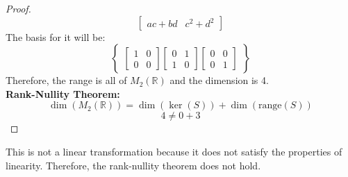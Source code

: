 {\begin{proof}
\[\begin{bmatrix}
                ac + bd & c^2 + d^2
            \end{bmatrix}
        \]
        The basis for it will be: \\
        \[
            \begin{Bmatrix}
                \begin{bmatrix}
                    1 & 0 \\
                    0 & 0
                \end{bmatrix}
                \begin{bmatrix}
                    0 & 1 \\
                    1 & 0
                \end{bmatrix}
                \begin{bmatrix}
                    0 & 0 \\
                    0 & 1
                \end{bmatrix}
            \end{Bmatrix}
        \]
        Therefore, the range is all of $M_2(\mathbb{R})$ and the dimension is 4. \\
        \textbf{Rank-Nullity Theorem:} \\
        \[
            \dim(M_2(\mathbb{R})) = \dim(\ker(S)) + \dim(\text{range}(S))
        \]
        \[
            \boxed{4 \neq 0 + 3}
        \]
        
    \end{proof}

    This is not a linear transformation because it does not satisfy the properties of linearity. Therefore, the rank-nullity theorem does not hold.


}


